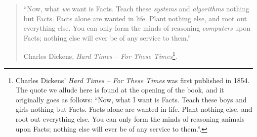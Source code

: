 \vspace{0.5cm}



\begin{quotation}
``Now, what \emph{we} want is Facts. Teach these \emph{systems} and \emph{algorithms} nothing but Facts. Facts alone are wanted in life. Plant nothing else, and root out everything else. You can only form the minds of reasoning \emph{computers} upon Facts; nothing else will ever be of any service to them.''
\vspace{0.15cm}

\hfill Charles Dickens, \emph{Hard Times -- For These Times}\footnote{Charles Dickens' \emph{Hard Times -- For These Times} was first published in 1854. The quote we allude here is found at the opening of the book, and it originally goes as follows: ``Now, what I want is Facts. Teach these boys and girls nothing but Facts. Facts alone are wanted in life. Plant nothing else, and root out everything else. You can only form the minds of reasoning animals upon Facts; nothing else will ever be of any service to them.''.}.
\end{quotation}

